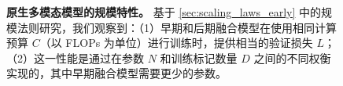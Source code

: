 \begin{figure}[t!]
    \centering
    \captionsetup{type=figure}
    \begin{subfigure}[t]{0.48\linewidth}
        
    \end{subfigure}
    \hfill
    \begin{subfigure}[t]{0.48\linewidth}
        
    \end{subfigure}
    \vspace{-3mm}
    \caption{\textbf{原生多模态模型的规模特性。} 基于 \cref{sec:scaling_laws_early} 中的规模法则研究，我们观察到：（1）早期和后期融合模型在使用相同计算预算 $C$（以 FLOPs 为单位）进行训练时，提供相当的验证损失 $L$；（2）这一性能是通过在参数 $N$ 和训练标记数量 $D$ 之间的不同权衡实现的，其中早期融合模型需要更少的参数。  }
    \label{fig:teaser}
\end{figure}
